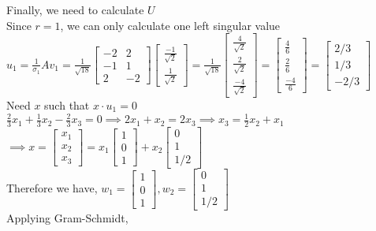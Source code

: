 \documentclass[12pt]{article}
\begin{document}
\begin{enumerate}[label=(\alph*)]
Finally, we need to calculate $U$ \\
Since $r=1$, we can only calculate one left singular value \\ 
$u_1 = \frac{1}{\sigma_1} Av_1 = \frac{1}{\sqrt{18}} \begin{bmatrix}
    -2 & 2 \\
    -1 & 1 \\ 
    2 & -2 
\end{bmatrix} \begin{bmatrix}
\frac{-1}{\sqrt{2}} \\ \frac{1}{\sqrt{2}}
\end{bmatrix} = \frac{1}{\sqrt{18}}\begin{bmatrix}
    \frac{4}{\sqrt{2}} \\
    \frac{2}{\sqrt{2}} \\ 
    \frac{-4}{\sqrt{2}}
\end{bmatrix} = \begin{bmatrix}
    \frac{4}{6} \\
    \frac{2}{6} \\ 
    \frac{-4}{6}
\end{bmatrix} = \begin{bmatrix}
    2/3 \\ 1/3 \\ -2/3
\end{bmatrix}$   \\

Need $x$ such that $x \cdot u_1 = 0$ \\
$\frac{2}{3} x_1 + \frac{1}{3}x_2 - \frac{2}{3}x_3 = 0 \implies 2x_1 + x_2 = 2x_3 \implies x_3 = \frac{1}{2}x_2 + x_1 $ \\
$\implies x = \begin{bmatrix}
    x_1 \\ x_2 \\ x_3 
\end{bmatrix} =  x_1\begin{bmatrix}
   1 \\ 0 \\ 1
\end{bmatrix} + x_2\begin{bmatrix}
   0 \\ 1 \\ 1/2
\end{bmatrix}$ \\
Therefore we have,
$w_1 =  \begin{bmatrix}
   1 \\ 0 \\ 1
\end{bmatrix}, w_2= \begin{bmatrix}
   0 \\ 1 \\ 1/2
\end{bmatrix}$ \\
Applying Gram-Schmidt, \\


\end{enumerate}
\end{document}
